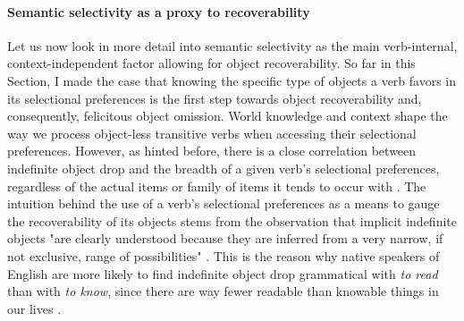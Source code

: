 \paragraph{Semantic selectivity as a proxy to recoverability}

Let us now look in more detail into semantic selectivity as the main verb-internal, context-independent factor allowing for object recoverability. So far in this Section, I made the case that knowing the specific type of objects a verb favors in its selectional preferences is the first step towards object recoverability and, consequently, felicitous object omission. World knowledge and context shape the way we process object-less transitive verbs when accessing their selectional preferences. However, as hinted before, there is a close correlation between indefinite object drop and the breadth of a given verb's selectional preferences, regardless of the actual items or family of items it tends to occur with \parencite{Garcia-VelascoMunoz2002, Liu2008, Glass2020, Medina2007, MaoueneEtAl2011, OlsenResnik1997, Resnik1993, Resnik1996}. The intuition behind the use of a verb's selectional preferences as a means to gauge the recoverability of its objects stems from the observation that implicit indefinite objects "are clearly understood because they are inferred from a very narrow, if not exclusive, range of possibilities" \parencite[4]{Garcia-VelascoMunoz2002}. This is the reason why native speakers of English are more likely to find indefinite object drop grammatical with \textit{to read} than with \textit{to know}, since there are way fewer readable than knowable things in our lives \parencite[302]{Liu2008}.\\
